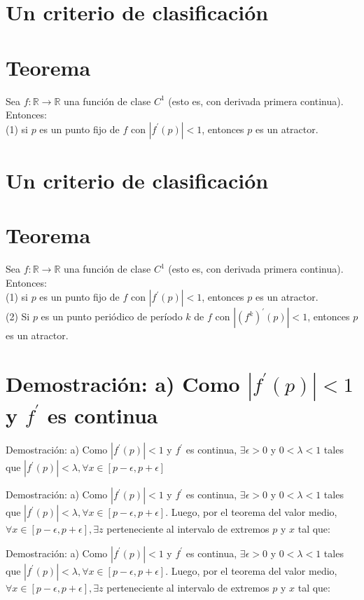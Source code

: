 \documentclass[11pt]{beamer}
\begin{document}
\section*{Un criterio de clasificación}
\section*{Teorema}
Sea $f: \mathbb{R} \rightarrow \mathbb{R}$ una función de clase $C^{1}$ (esto es, con derivada primera continua). Entonces:\\
(1) si $p$ es un punto fijo de $f$ con $\left|f^{\prime}(p)\right|<1$, entonces $p$ es un atractor.

\section*{Un criterio de clasificación}
\section*{Teorema}
Sea $f: \mathbb{R} \rightarrow \mathbb{R}$ una función de clase $C^{1}$ (esto es, con derivada primera continua). Entonces:\\
(1) si $p$ es un punto fijo de $f$ con $\left|f^{\prime}(p)\right|<1$, entonces $p$ es un atractor.\\
(2) Si $p$ es un punto periódico de período $k$ de $f$ con $\left|\left(f^{k}\right)^{\prime}(p)\right|<1$, entonces $p$ es un atractor.

\section*{Demostración: a) Como $\left|f^{\prime}(p)\right|<1$ y $f^{\prime}$ es continua}
Demostración: a) Como $\left|f^{\prime}(p)\right|<1$ y $f^{\prime}$ es continua, $\exists \epsilon>0$ y $0<\lambda<1$ tales que $\left|f^{\prime}(p)\right|<\lambda, \forall x \in[p-\epsilon, p+\epsilon]$

Demostración: a) Como $\left|f^{\prime}(p)\right|<1$ y $f^{\prime}$ es continua, $\exists \epsilon>0$ y $0<\lambda<1$ tales que $\left|f^{\prime}(p)\right|<\lambda, \forall x \in[p-\epsilon, p+\epsilon]$. Luego, por el teorema del valor medio, $\forall x \in[p-\epsilon, p+\epsilon], \exists z$ perteneciente al intervalo de extremos $p$ y $x$ tal que:

Demostración: a) Como $\left|f^{\prime}(p)\right|<1$ y $f^{\prime}$ es continua, $\exists \epsilon>0$ y $0<\lambda<1$ tales que $\left|f^{\prime}(p)\right|<\lambda, \forall x \in[p-\epsilon, p+\epsilon]$. Luego, por el teorema del valor medio, $\forall x \in[p-\epsilon, p+\epsilon], \exists z$ perteneciente al intervalo de extremos $p$ y $x$ tal que:
\end{document}
